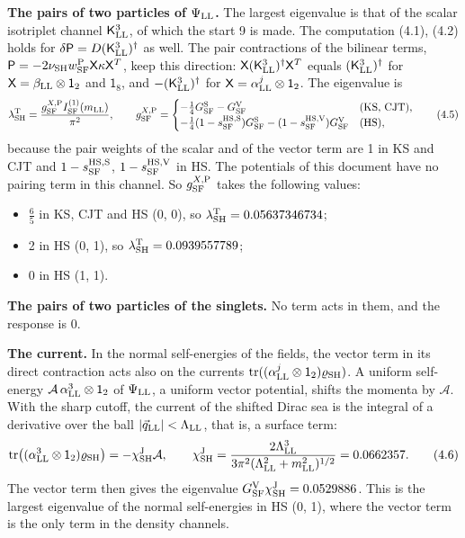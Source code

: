 \documentclass[
  10pt,
]{article}
\providecommand{\tightlist}{%
  \setlength{\itemsep}{0pt}\setlength{\parskip}{0pt}}
\begin{document}
\textbf{The pairs of two particles of \(\Psi_{\rm LL}\).} The largest
eigenvalue is that of the scalar isotriplet channel
\(\mathsf K^3_{\rm LL}\), of which the start 9 is made. The computation
(4.1), (4.2) holds for
\(\delta\mathsf P=D(\mathsf K^3_{\rm LL})^\dagger\) as well. The pair
contractions of the bilinear terms,
\(\mathsf P=-2\nu_{\rm SH}w^{\rm P}_{\rm SF}\mathsf X\kappa\mathsf X^T\),
keep this direction:
\(\mathsf X(\mathsf K^3_{\rm LL})^\dagger\mathsf X^T\) equals
\((\mathsf K^3_{\rm LL})^\dagger\) for
\(\mathsf X=\beta_{\rm LL}\otimes\mathsf 1_2\) and \(\mathsf 1_8\), and
\(-(\mathsf K^3_{\rm LL})^\dagger\) for
\(\mathsf X=\alpha^j_{\rm LL}\otimes\mathsf 1_2\). The eigenvalue is
\[\lambda^{\rm T}_{\rm SH}=\frac{g^{X,{\rm P}}_{\rm SF}I^{(1)}_{\rm SF}(m_{\rm LL})}{\pi^2},\qquad
g^{X,{\rm P}}_{\rm SF}=\begin{cases}-\tfrac14G^{\rm S}_{\rm SF}-G^{\rm V}_{\rm SF}&\text{(KS, CJT)},\\
-\tfrac14(1-s^{\rm HS,S}_{\rm SF})G^{\rm S}_{\rm SF}-(1-s^{\rm HS,V}_{\rm SF})G^{\rm V}_{\rm SF}&\text{(HS)},\end{cases}\tag{4.5}\]
because the pair weights of the scalar and of the vector term are 1 in
KS and CJT and \(1-s^{\rm HS,S}_{\rm SF}\), \(1-s^{\rm HS,V}_{\rm SF}\)
in HS. The potentials of this document have no pairing term in this
channel. So \(g^{X,{\rm P}}_{\rm SF}\) takes the following values:

\begin{itemize}
\tightlist
\item
  \(\tfrac65\) in KS, CJT and HS (0, 0), so
  \(\lambda^{\rm T}_{\rm SH}=0.05637346734\);
\item
  2 in HS (0, 1), so \(\lambda^{\rm T}_{\rm SH}=0.0939557789\);
\item
  0 in HS (1, 1).
\end{itemize}

\textbf{The pairs of two particles of the singlets.} No term acts in
them, and the response is 0.

\textbf{The current.} In the normal self-energies of the fields, the
vector term in its direct contraction acts also on the currents
\(\mathrm{tr}((\alpha^j_{\rm LL}\otimes\mathsf 1_2)\varrho_{\rm SH})\).
A uniform self-energy
\(\mathcal A\,\alpha^3_{\rm LL}\otimes\mathsf 1_2\) of
\(\Psi_{\rm LL}\), a uniform vector potential, shifts the momenta by
\(\mathcal A\). With the sharp cutoff, the current of the shifted Dirac
sea is the integral of a derivative over the ball
\(\lvert\vec q_{\rm LL}\rvert<\Lambda_{\rm LL}\), that is, a surface
term:
\[\mathrm{tr}\big((\alpha^3_{\rm LL}\otimes\mathsf 1_2)\varrho_{\rm SH}\big)=-\chi^{\rm J}_{\rm SH}\mathcal A,\qquad
\chi^{\rm J}_{\rm SH}=\frac{2\Lambda_{\rm LL}^3}{3\pi^2(\Lambda_{\rm LL}^2+m_{\rm LL}^2)^{1/2}}=0.0662357.\tag{4.6}\]
The vector term then gives the eigenvalue
\(G^{\rm V}_{\rm SF}\chi^{\rm J}_{\rm SH}=0.0529886\). This is the
largest eigenvalue of the normal self-energies in HS (0, 1), where the
vector term is the only term in the density channels.
\end{document}
